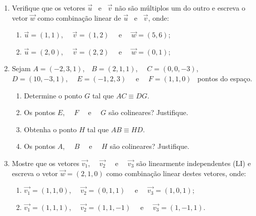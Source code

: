 \documentclass[12pt]{article}
\begin{document}
\begin{enumerate}
  \item Verifique que os vetores $\overrightarrow{u}$ \ e \ $\overrightarrow{v}$  n\~{a}o s\~{a}o m\'{u}ltiplos um do outro e escreva o vetor $\overrightarrow{w}$  como combina\c{c}\~{a}o linear de $\overrightarrow{u}$ \ e \  $\overrightarrow{v}$, onde:
        \begin{enumerate}
          \item  $\overrightarrow{u} = (1,1)$, \ \ $\overrightarrow{v} = (1,2)$ \ \ e \ \ $\overrightarrow{w} = (5,6)$;
          \item  $\overrightarrow{u} = (2,0)$, \ \ $\overrightarrow{v} = (2,2)$ \ \ e \ \ $\overrightarrow{w} = (0,1)$;
        \end{enumerate}
  \item Sejam $A =(-2,3,1)$,\ \ $B = (2,1,1)$, \ \ $C = (0,0,-3)$, \ \ $D = (10,-3,1)$, \ \ $E = (-1,2,3)$ \ \ e \ \ $F = (1,1,0)$ \ pontos do espa\c{c}o.
        \begin{enumerate}
          \item Determine o ponto $G$ tal que $AC \equiv DG$.
          \item Os pontos $E$, \ \ $F$ \ \ e \ \ $G$  s\~{a}o colineares? Justifique.
          \item Obtenha o ponto $H$ tal que $AB \equiv HD$.
          \item Os pontos $A$, \ \ $B$ \ \ e \ \ $H$  s\~{a}o colineares? Justifique.
        \end{enumerate}
  \item Mostre que os vetores $\overrightarrow{v_{1}}$, \ \ $\overrightarrow{v_{2}}$ \ \ e \ \ $\overrightarrow{v_{3}}$  s\~{a}o  linearmente independentes (LI) e escreva o vetor  $\overrightarrow{w} = (2,1,0)$  como combina\c{c}\~{a}o linear destes vetores, onde:
        \begin{enumerate}
          \item $\overrightarrow{v_{1}} = (1,1,0)$, \ \ $\overrightarrow{v_{2}} = (0,1,1)$ \ \ e \ \ $\overrightarrow{v_{3}} = (1,0,1)$;
          \item $\overrightarrow{v_{1}} = (1,1,1)$, \ \ $\overrightarrow{v_{2}} = (1,1,-1)$ \ \ e \ \ $\overrightarrow{v_{3}} = (1,-1,1)$.
        \end{enumerate}


\end{enumerate}
\end{document}
